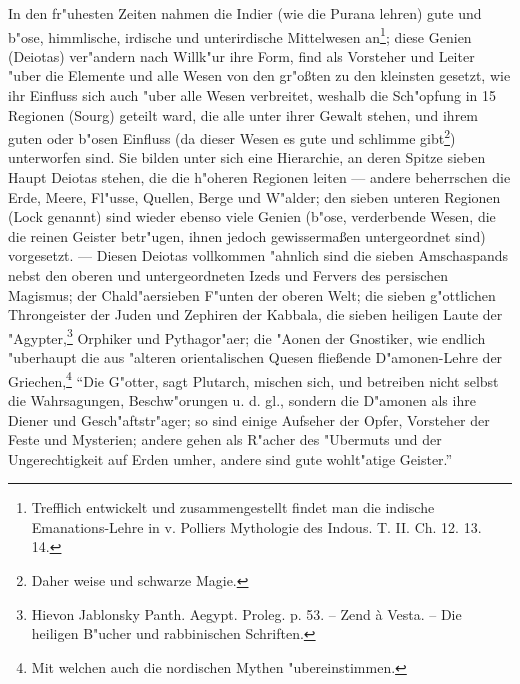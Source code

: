\documentclass[a4paper, 11pt, oneside, polutonikogreek, german]{article}
\begin{document}
In den fr"uhesten Zeiten nahmen die Indier (wie die Purana lehren) gute und b"ose, himmlische, irdische und unterirdische Mittelwesen an\footnote{Trefflich entwickelt und zusammengestellt findet man die indische Emanations-Lehre in v. Polliers Mythologie des Indous. T. II. Ch. 12. 13. 14.}; diese Genien (Deiotas) ver"andern nach Willk"ur ihre Form, find als Vorsteher und Leiter "uber die Elemente und alle Wesen von den gr"oßten zu den kleinsten gesetzt, wie ihr Einfluss sich auch "uber alle Wesen verbreitet, weshalb die Sch"opfung in 15 Regionen (Sourg) geteilt ward, die alle unter ihrer Gewalt stehen, und ihrem guten oder b"osen Einfluss (da dieser Wesen es gute und schlimme gibt\footnote{Daher weise und schwarze Magie.}) unterworfen sind. Sie bilden unter sich eine Hierarchie, an deren Spitze sieben Haupt Deiotas stehen, die die h"oheren Regionen leiten --- andere beherrschen die Erde, Meere, Fl"usse, Quellen, Berge und W"alder; den sieben unteren Regionen (Lock genannt) sind wieder ebenso viele Genien (b"ose, verderbende Wesen, die die reinen Geister betr"ugen, ihnen jedoch gewissermaßen untergeordnet sind) vorgesetzt. --- Diesen Deiotas vollkommen "ahnlich sind die sieben Amschaspands nebst den oberen und untergeordneten Izeds und Fervers des persischen Magismus; der Chald"aersieben F"unten der oberen Welt; die sieben g"ottlichen Throngeister der Juden und Zephiren der Kabbala, die sieben heiligen Laute der "Agypter,\footnote{Hievon Jablonsky Panth. Aegypt. Proleg. p. 53. -- Zend à Vesta. -- Die heiligen B"ucher und rabbinischen Schriften.} Orphiker und Pythagor"aer; die "Aonen der Gnostiker, wie endlich "uberhaupt die aus "alteren orientalischen Quesen fließende D"amonen-Lehre der Griechen,\footnote{Mit welchen auch die nordischen Mythen "ubereinstimmen.} "`Die G"otter, sagt Plutarch, mischen sich, und betreiben nicht selbst die Wahrsagungen, Beschw"orungen u. d. gl., sondern die D"amonen als ihre Diener und Gesch"aftstr"ager; so sind einige Aufseher der Opfer, Vorsteher der Feste und Mysterien; andere gehen als R"acher des "Ubermuts und der Ungerechtigkeit auf Erden umher, andere sind gute wohlt"atige Geister."'
\end{document}
